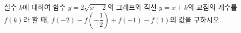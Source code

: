 실수 $k$에 대하여 함수 $y=2\sqrt{x-2}$의 그래프와 직선 $y=x+k$의 교점의 개수를 $f(k)$라 할 때, $f(-2)-f\left(-\dfrac{1}{2}\right)+f(-1)-f(1)$의 값을 구하시오.
